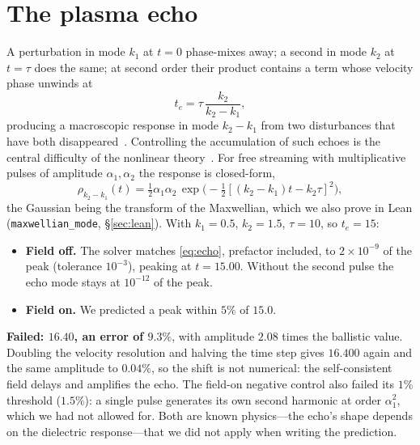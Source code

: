 \documentclass[11pt,a4paper]{article}
\newcommand{\lean}[1]{\texttt{\small #1}}
\begin{document}
\section{The plasma echo}
\label{sec:k3}

A perturbation in mode $k_1$ at $t=0$ phase-mixes away; a second in mode $k_2$ at $t=\tau$ does the
same; at second order their product contains a term whose velocity phase unwinds at
\begin{equation}
t_e=\tau\,\frac{k_2}{k_2-k_1},
\end{equation}
producing a macroscopic response in mode $k_2-k_1$ from two disturbances that have both
disappeared~\cite{Gould1967}. Controlling the accumulation of such echoes is the central difficulty of
the nonlinear theory~\cite{MouhotVillani2011}. For free streaming with multiplicative pulses of amplitude
$\alpha_1,\alpha_2$ the response is closed-form,
\begin{equation}
\rho_{k_2-k_1}(t) = \tfrac12\alpha_1\alpha_2\,
  \exp\!\bigl(-\tfrac12[(k_2-k_1)t-k_2\tau]^2\bigr),
\label{eq:echo}
\end{equation}
the Gaussian being the transform of the Maxwellian, which we also prove in Lean
(\lean{maxwellian\_mode}, \S\ref{sec:lean}). With $k_1=0.5$, $k_2=1.5$, $\tau=10$, so $t_e=15$:

\begin{itemize}[leftmargin=*,itemsep=2pt]
\item \textbf{Field off.} The solver matches \eqref{eq:echo}, prefactor included, to
  $2\times10^{-9}$ of the peak (tolerance $10^{-3}$), peaking at $t=15.00$. Without the second pulse the
  echo mode stays at $10^{-12}$ of the peak.
\item \textbf{Field on.} We predicted a peak within $5\%$ of $15.0$.
\end{itemize}

\begin{failbox}
\textbf{Failed: $16.40$, an error of $9.3\%$}, with amplitude $2.08$ times the ballistic value. Doubling
the velocity resolution and halving the time step gives $16.400$ again and the same amplitude to
$0.04\%$, so the shift is not numerical: the self-consistent field delays and amplifies the echo. The
field-on negative control also failed its $1\%$ threshold ($1.5\%$): a single pulse generates its own
second harmonic at order $\alpha_1^2$, which we had not allowed for. Both are known physics---the
echo's shape depends on the dielectric response---that we did not apply when writing the prediction.
\end{failbox}
\end{document}
